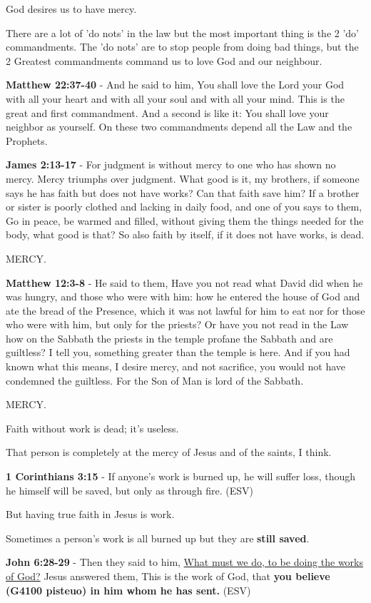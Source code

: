 \documentclass[11pt]{article}
\begin{document}
God desires us to have mercy.

There are a lot of 'do nots' in the law but the most important thing is the 2 'do' commandments.
The 'do nots' are to stop people from doing bad things, but the 2 Greatest commandments command us to love God and our neighbour.

\textbf{Matthew 22:37-40} - And he said to him, You shall love the Lord your God with all your heart and with all your soul and with all your mind. This is the great and first commandment. And a second is like it: You shall love your neighbor as yourself. On these two commandments depend all the Law and the Prophets.

\textbf{James 2:13-17} - For judgment is without mercy to one who has shown no mercy. Mercy triumphs over judgment. What good is it, my brothers, if someone says he has faith but does not have works? Can that faith save him? If a brother or sister is poorly clothed and lacking in daily food, and one of you says to them, Go in peace, be warmed and filled, without giving them the things needed for the body, what good is that? So also faith by itself, if it does not have works, is dead.

MERCY.

\textbf{Matthew 12:3-8} - He said to them, Have you not read what David did when he was hungry, and those who were with him: how he entered the house of God and ate the bread of the Presence, which it was not lawful for him to eat nor for those who were with him, but only for the priests? Or have you not read in the Law how on the Sabbath the priests in the temple profane the Sabbath and are guiltless? I tell you, something greater than the temple is here. And if you had known what this means, I desire mercy, and not sacrifice, you would not have condemned the guiltless. For the Son of Man is lord of the Sabbath.

MERCY.

Faith without work is dead; it's useless.

That person is completely at the mercy of Jesus and of the saints, I think.

\textbf{1 Corinthians 3:15} - If anyone's work is burned up, he will suffer loss, though he himself will be saved, but only as through fire. (ESV)

But having true faith in Jesus is work.

Sometimes a person's work is all burned up but they are \textbf{still saved}.

\textbf{John 6:28-29} - Then they said to him, \uline{What must we do, to be doing the works of God?} Jesus answered them, This is the work of God, that \textbf{you believe (G4100 pisteuo) in him whom he has sent.} (ESV)
\end{document}
